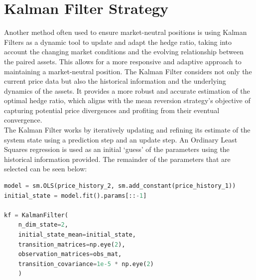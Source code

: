 \section{Kalman Filter Strategy}
Another method often used to ensure market-neutral positions is using Kalman Filters as a dynamic tool to update and adapt the hedge ratio, taking into account the changing market conditions and the evolving relationship between the paired assets. This allows for a more responsive and adaptive approach to maintaining a market-neutral position. The Kalman Filter considers not only the current price data but also the historical information and the underlying dynamics of the assets. It provides a more robust and accurate estimation of the optimal hedge ratio, which aligns with the mean reversion strategy's objective of capturing potential price divergences and profiting from their eventual convergence.
\\[3mm]
The Kalman Filter works by iteratively updating and refining its estimate of the system state using a prediction step and an update step. An Ordinary Least Squares regression is used as an initial `guess' of the parameters using the historical information provided. The remainder of the parameters that are selected can be seen below:
\begin{lstlisting}[language=Python]
model = sm.OLS(price_history_2, sm.add_constant(price_history_1))
initial_state = model.fit().params[::-1]

kf = KalmanFilter(
    n_dim_state=2,
    initial_state_mean=initial_state,
    transition_matrices=np.eye(2),
    observation_matrices=obs_mat,
    transition_covariance=1e-5 * np.eye(2)
    )
\end{lstlisting}

